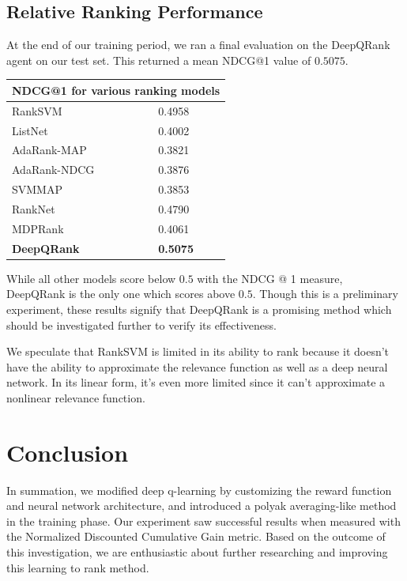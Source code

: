 \documentclass{article}
\begin{document}
\subsection{Relative Ranking Performance}

At the end of our training period, we ran a final evaluation on the DeepQRank agent on our test set. This returned a mean NDCG@1 value of $0.5075$.

\begin{center}
\begin{tabular}{|l|l|}
\hline
\multicolumn{2}{|c|}{NDCG@1 for various ranking models} \\
\hline
RankSVM      & 0.4958     \\
ListNet      & 0.4002     \\ 
AdaRank-MAP  & 0.3821     \\
AdaRank-NDCG & 0.3876     \\
SVMMAP       & 0.3853     \\ 
RankNet       & 0.4790     \\ 
MDPRank      & 0.4061     \\ 
\textbf{DeepQRank}      & \textbf{0.5075}     \\
\hline
\end{tabular}
\end{center}

While all other models score below $0.5$ with the NDCG @ 1 measure, DeepQRank is the only one which scores above $0.5$. Though this is a preliminary experiment, these results signify that DeepQRank is a promising method which should be investigated further to verify its effectiveness.

We speculate that RankSVM is limited in its ability to rank because it doesn't have the ability to approximate the relevance function as well as a deep neural network. In its linear form, it's even more limited since it can't approximate a nonlinear relevance function.

\section{Conclusion}

In summation, we modified deep q-learning by customizing the reward function and neural network architecture, and introduced a polyak averaging-like method in the training phase. Our experiment saw successful results when measured with the Normalized Discounted Cumulative Gain metric. Based on the outcome of this investigation, we are enthusiastic about further researching and improving this learning to rank method.
\end{document}
